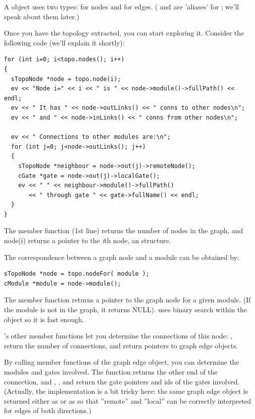 %
%

A  object uses two types:  for
nodes and  for edges. ( and
 are 'aliases' for ; we'll
speak about them later.)

Once you have the topology extracted, you can start exploring
it. Consider the following code (we'll explain it shortly):

\begin{verbatim}
for (int i=0; i<topo.nodes(); i++)
{
  sTopoNode *node = topo.node(i);
  ev << "Node i=" << i << " is " << node->module()->fullPath() << endl;
  ev << " It has " << node->outLinks() << " conns to other nodes\n";
  ev << " and " << node->inLinks() << " conns from other nodes\n";

  ev << " Connections to other modules are:\n";
  for (int j=0; j<node->outLinks(); j++)
  {
    sTopoNode *neighbour = node->out(j)->remoteNode();
    cGate *gate = node->out(j)->localGate();
    ev << " " << neighbour->module()->fullPath()
       << " through gate " << gate->fullName() << endl;
  }
}
\end{verbatim}

The  member function (1st line) returns the number of
nodes in the graph, and node(i) returns a pointer to the \textit{i}th
node, an  structure.


The correspondence between a graph node and a module can be obtained
by:

\begin{verbatim}
sTopoNode *node = topo.nodeFor( module );
cModule *module = node->module();
\end{verbatim}


The  member function returns a pointer to the graph
node for a given module. (If the module is not in the graph, it
returns NULL).  uses binary search within the
 object so it is fast enough.


's other member functions let you determine the
connections of this node: ,  return
the number of connections,  and
 return pointers to graph edge objects.


By calling member functions of the graph edge object, you can
determine the modules and gates involved. The 
function returns the other end of the connection, and
, ,  and
 return the gate pointers and ids of the gates
involved. (Actually, the implementation is a bit tricky here: the same
graph edge object  is returned either as
 or as  so that ''remote''
and ''local'' can be correctly interpreted for edges of both
directions.)





